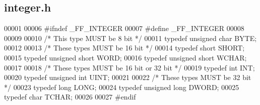 \hypertarget{integer_8h_source}{\subsection{integer.\+h}
\label{integer_8h_source}
}

\begin{DoxyCode}
00001 
00006 \textcolor{preprocessor}{#ifndef \_FF\_INTEGER}
00007 \textcolor{preprocessor}{#define \_FF\_INTEGER}
00008 
00009 
00010 \textcolor{comment}{/* This type MUST be 8 bit */}
00011 \textcolor{keyword}{typedef} \textcolor{keywordtype}{unsigned} \textcolor{keywordtype}{char}  BYTE;
00012 
00013 \textcolor{comment}{/* These types MUST be 16 bit */}
00014 \textcolor{keyword}{typedef} \textcolor{keywordtype}{short}      SHORT;
00015 \textcolor{keyword}{typedef} \textcolor{keywordtype}{unsigned} \textcolor{keywordtype}{short}  WORD;
00016 \textcolor{keyword}{typedef} \textcolor{keywordtype}{unsigned} \textcolor{keywordtype}{short}  WCHAR;
00017 
00018 \textcolor{comment}{/* These types MUST be 16 bit or 32 bit */}
00019 \textcolor{keyword}{typedef} \textcolor{keywordtype}{int}        INT;
00020 \textcolor{keyword}{typedef} \textcolor{keywordtype}{unsigned} \textcolor{keywordtype}{int}  UINT;
00021 
00022 \textcolor{comment}{/* These types MUST be 32 bit */}
00023 \textcolor{keyword}{typedef} \textcolor{keywordtype}{long}      LONG;
00024 \textcolor{keyword}{typedef} \textcolor{keywordtype}{unsigned} \textcolor{keywordtype}{long}  DWORD;
00025 \textcolor{keyword}{typedef} \textcolor{keywordtype}{char} TCHAR;
00026 
00027 \textcolor{preprocessor}{#endif}
\end{DoxyCode}
